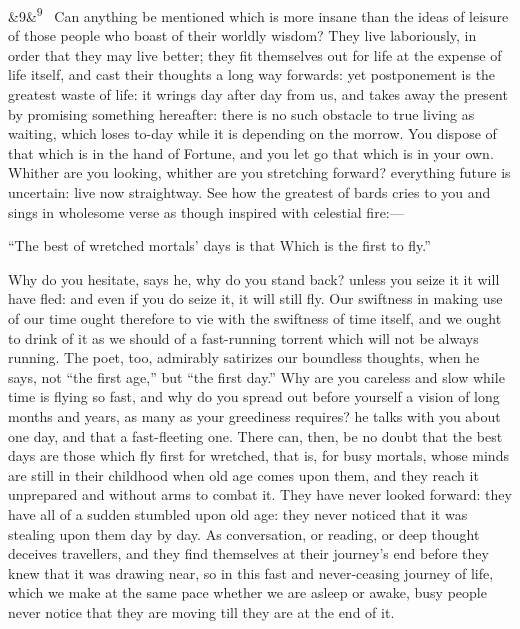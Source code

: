 \documentclass[12pt]{article}
\newcommand{\para}[1][]{\par\noindent\ifx&#1&\else\textsuperscript{\footnotesize #1}~\fi}
\begin{document}
\para[9] Can anything be mentioned which is more insane than the ideas of leisure of those people who boast of their worldly wisdom? They live laboriously, in order that they may live better; they fit themselves out for life at the expense of life itself, and cast their thoughts a long way forwards: yet postponement is the greatest waste of life: it wrings day after day from us, and takes away the present by promising something hereafter: there is no such obstacle to true living as waiting, which loses to-day while it is depending on the morrow. You dispose of that which is in the hand of Fortune, and you let go that which is in your own. Whither are you looking, whither are you stretching forward? everything future is uncertain: live now straightway. See how the greatest of bards cries to you and sings in wholesome verse as though inspired with celestial fire:—

“The best of wretched mortals’ days is that Which is the first to fly.”

Why do you hesitate, says he, why do you stand back? unless you seize it it will have fled: and even if you do seize it, it will still fly. Our swiftness in making use of our time ought therefore to vie with the swiftness of time itself, and we ought to drink of it as we should of a fast-running torrent which will not be always running. The poet, too, admirably satirizes our boundless thoughts, when he says, not “the first age,” but “the first day.” Why are you careless and slow while time is flying so fast, and why do you spread out before yourself a vision of long months and years, as many as your greediness requires? he talks with you about one day, and that a fast-fleeting one. There can, then, be no doubt that the best days are those which fly first for wretched, that is, for busy mortals, whose minds are still in their childhood when old age comes upon them, and they reach it unprepared and without arms to combat it. They have never looked forward: they have all of a sudden stumbled upon old age: they never noticed that it was stealing upon them day by day. As conversation, or reading, or deep thought deceives travellers, and they find themselves at their journey’s end before they knew that it was drawing near, so in this fast and never-ceasing journey of life, which we make at the same pace whether we are asleep or awake, busy people never notice that they are moving till they are at the end of it.
\end{document}
